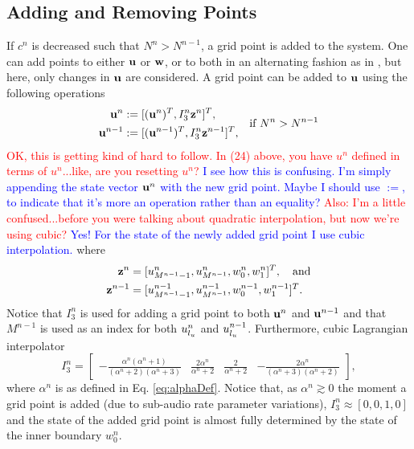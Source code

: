 \documentclass[fleqn]{jaes}
\def\SBcomment[#1]{\textcolor{red}{#1}}
\def\SWcomment[#1]{\textcolor{blue}{#1}}
\begin{document}
\subsection{Adding and Removing Points}\label{sec:addRemove}
If $c^n$ is decreased such that $N^n > N^{n-1}$, a grid point is added to the system. One can add points to either $\mathbf{u}$ or $\mathbf{w}$, or to both in an alternating fashion as in \cite{Willemsen2021a}, but here, only changes in $\mathbf{u}$ are considered. A grid point can be added to $\mathbf{u}$ using the following operations
\begin{equation}
\begin{aligned}
    \u^n &:= [(\u^n)^T, I_3^n\z^n]^T,\\
    \u^{n-1} &:= [(\u^{n-1})^T, I_3^n\z^{n-1}]^T,\\
\end{aligned} \quad \text{if } N^n > N^{n-1}
\end{equation}
\SBcomment[OK, this is getting kind of hard to follow. In (24) above, you have $u^{n}$ defined in terms of $u^{n}$...like, are you resetting $u^{n}$?] \SWcomment[I see how this is confusing. I'm simply appending the state vector $\mathbf{u}^n$ with the new grid point. Maybe I should use $:=$, to indicate that it's more an operation rather than an equality?] \SBcomment[Also: I'm a little confused...before you were talking about quadratic interpolation, but now we're using cubic?] \SWcomment[Yes! For the state of the newly added grid point I use cubic interpolation.] where
\begin{equation*}
    \begin{aligned}
        \z^n &= [u_{M^{n-1}-1}^n, u_{M^{n-1}}^n, w_0^n, w_1^n]^T, \quad \text{and}\\
        \z^{n-1} &= [u_{M^{n-1}-1}^{n-1}, u_{M^{n-1}}^{n-1}, w_0^{n-1}, w_1^{n-1}]^T.
    \end{aligned}
\end{equation*}
Notice that $I_3^n$ is used for adding a grid point to both $\mathbf{u}^n$ and $\mathbf{u}^{n-1}$ and that $M^{n-1}$ is used as an index for both $u^n_{l_u}$ and $u^{n-1}_{l_u}$.
Furthermore, cubic Lagrangian interpolator
\begin{equation}\label{eq:customIp}
    I_3^n = \begin{bmatrix} -\frac{\alpha^n(\alpha^n+1)}{(\alpha^n+2)(\alpha^n+3)} &\frac{2\alpha^n}{\alpha^n+2} &\frac{2}{\alpha^n+2} 
    &-\frac{2\alpha^n}{(\alpha^n+3)(\alpha^n+2)}
    \end{bmatrix},
\end{equation}
where $\alpha^n$ is as defined in Eq. \eqref{eq:alphaDef}. Notice that, as $\alpha^n \gtrsim 0$ the moment a grid point is added (due to sub-audio rate parameter variations), $I_3^n\approx [0, 0, 1, 0]$ and the state of the added grid point is almost fully determined by the state of the inner boundary $w_0^n$. 
\end{document}
